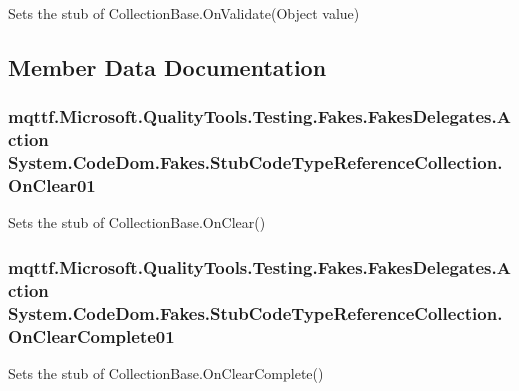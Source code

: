 Sets the stub of Collection\-Base.\-On\-Validate(\-Object value)



\subsection{Member Data Documentation}
\hypertarget{class_system_1_1_code_dom_1_1_fakes_1_1_stub_code_type_reference_collection_a5454840483eb744fea88f5a776f10757}{
\subsubsection[{On\-Clear01}]{\setlength{\rightskip}{0pt plus 5cm}mqttf.\-Microsoft.\-Quality\-Tools.\-Testing.\-Fakes.\-Fakes\-Delegates.\-Action System.\-Code\-Dom.\-Fakes.\-Stub\-Code\-Type\-Reference\-Collection.\-On\-Clear01}}\label{class_system_1_1_code_dom_1_1_fakes_1_1_stub_code_type_reference_collection_a5454840483eb744fea88f5a776f10757}


Sets the stub of Collection\-Base.\-On\-Clear()

\hypertarget{class_system_1_1_code_dom_1_1_fakes_1_1_stub_code_type_reference_collection_a12d5903f71dd1eca277df84551414afa}{
\subsubsection[{On\-Clear\-Complete01}]{\setlength{\rightskip}{0pt plus 5cm}mqttf.\-Microsoft.\-Quality\-Tools.\-Testing.\-Fakes.\-Fakes\-Delegates.\-Action System.\-Code\-Dom.\-Fakes.\-Stub\-Code\-Type\-Reference\-Collection.\-On\-Clear\-Complete01}}\label{class_system_1_1_code_dom_1_1_fakes_1_1_stub_code_type_reference_collection_a12d5903f71dd1eca277df84551414afa}


Sets the stub of Collection\-Base.\-On\-Clear\-Complete()

